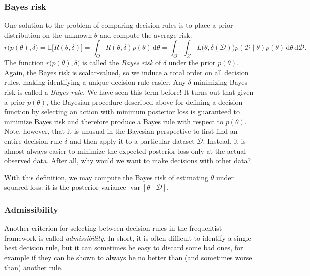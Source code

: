 \documentclass{article}
\newcommand{\given}{\mid}
\newcommand{\mc}[1]{\mathcal{#1}}
\newcommand{\data}{\mc{D}}
\newcommand{\intd}[1]{\,\mathrm{d}{#1}}
\DeclareMathOperator{\var}{var}
\begin{document}
\subsubsection*{Bayes risk}

One solution to the problem of comparing decision rules is to place a
prior distribution on the unknown $\theta$ and compute the average
risk:
\begin{equation*}
  r\bigl(p(\theta), \delta\bigr)
  =
  \mathbb{E}\bigl[R(\theta, \delta)\bigr]
  =
  \int_{\Theta}
  R(\theta, \delta)
  p(\theta)
  \intd{\theta}
  =
  \int_{\Theta}
  \int_{\mc{X}}
  L\bigl(\theta, \delta(\data)\bigr)
  p(\data \given \theta)
  p(\theta)
  \intd{\theta}
  \intd{\data}.
\end{equation*}
The function $r\bigl(p(\theta), \delta\bigr)$ is called the
\emph{Bayes risk} of $\delta$ under the prior $p(\theta)$.  Again, the
Bayes risk is scalar-valued, so we induce a total order on all
decision rules, making identifying a unique decision rule easier.  Any
$\delta$ minimizing Bayes risk is called a \emph{Bayes rule.}  We have
seen this term before!  It turns out that given a prior $p(\theta)$,
the Bayesian procedure described above for defining a decision
function by selecting an action with minimum posterior loss is
guaranteed to minimize Bayes risk and therefore produce a Bayes rule
with respect to $p(\theta)$.  Note, however, that it is unusual in the
Bayesian perspective to first find an entire decision rule $\delta$
and then apply it to a particular dataset $\data$.  Instead, it is
almost always easier to minimize the expected posterior loss only at
the actual observed data.  After all, why would we want to make
decisions with other data?

With this definition, we may compute the Bayes risk of estimating
$\theta$ under squared loss: it is the posterior variance $\var[\theta
  \given \data]$.

\subsubsection*{Admissibility}

Another criterion for selecting between decision rules in the
frequentist framework is called \emph{admissibility.}  In short, it is
often difficult to identify a single best decision rule, but it can
sometimes be easy to discard some bad ones, for example if they can be
shown to always be no better than (and sometimes worse than) another
rule.
\end{document}
